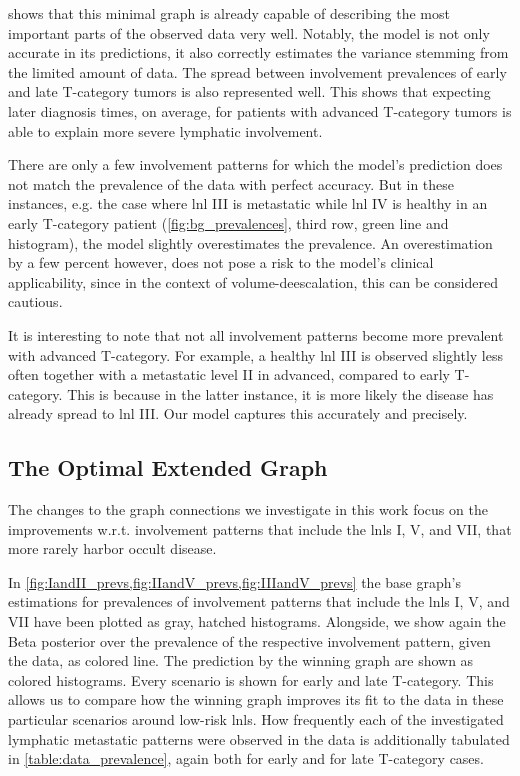 \documentclass[twocolumn]{aastex631}
\begin{document}
 shows that this minimal graph is already capable of describing the most important parts of the observed data very well. Notably, the model is not only accurate in its predictions, it also correctly estimates the variance stemming from the limited amount of data. The spread between involvement prevalences of early and late T-category tumors is also represented well. This shows that expecting later diagnosis times, on average, for patients with advanced T-category tumors is able to explain more severe lymphatic involvement.

There are only a few involvement patterns for which the model's prediction does not match the prevalence of the data with perfect accuracy. But in these instances, e.g. the case where \gls{lnl} III is metastatic while \gls{lnl} IV is healthy in an early T-category patient (\cref{fig:bg_prevalences}, third row, green line and histogram), the model slightly overestimates the prevalence. An overestimation by a few percent however, does not pose a risk to the model's clinical applicability, since in the context of volume-deescalation, this can be considered cautious.

It is interesting to note that not all involvement patterns become more prevalent with advanced T-category. For example, a healthy \gls{lnl} III is observed slightly less often together with a metastatic level II in advanced, compared to early T-category. This is because in the latter instance, it is more likely the disease has already spread to \gls{lnl} III. Our model captures this accurately and precisely.



\subsection{The Optimal Extended Graph}
\label{subsec:results:optimal_graph}

The changes to the graph connections we investigate in this work focus on the improvements w.r.t. involvement patterns that include the \glspl{lnl} I, V, and VII, that more rarely harbor occult disease.

In \cref{fig:IandII_prevs,fig:IIandV_prevs,fig:IIIandV_prevs} the base graph's estimations for prevalences of involvement patterns that include the \glspl{lnl} I, V, and VII have been plotted as gray, hatched histograms. Alongside, we show again the Beta posterior over the prevalence of the respective involvement pattern, given the data, as colored line. The prediction by the winning graph are shown as colored histograms. Every scenario is shown for early and late T-category. This allows us to compare how the winning graph improves its fit to the data in these particular scenarios around low-risk \glspl{lnl}. How frequently each of the investigated lymphatic metastatic patterns were observed in the data is additionally tabulated in \cref{table:data_prevalence}, again both for early and for late T-category cases.
\end{document}
